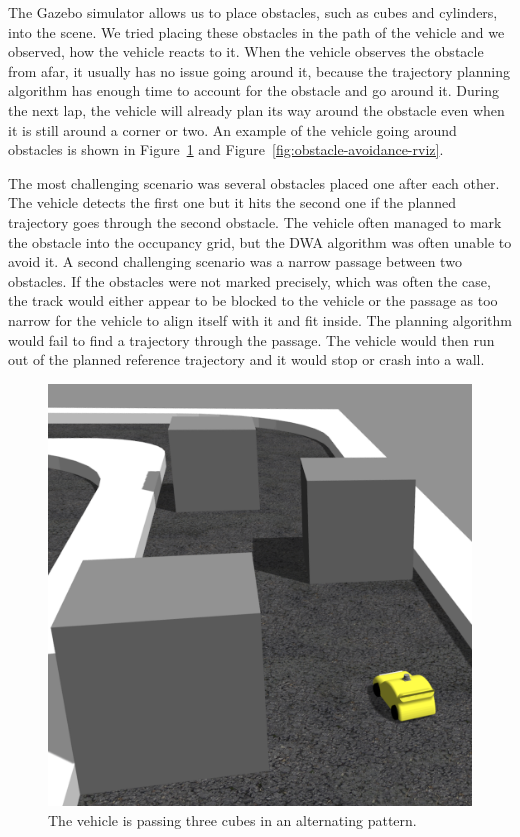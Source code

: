 The Gazebo simulator allows us to place obstacles, such as cubes and cylinders, into the scene. We tried placing these obstacles in the path of the vehicle and we observed, how the vehicle reacts to it. When the vehicle observes the obstacle from afar, it usually has no issue going around it, because the trajectory planning algorithm has enough time to account for the obstacle and go around it. During the next lap, the vehicle will already plan its way around the obstacle even when it is still around a corner or two. An example of the vehicle going around obstacles is shown in Figure~\ref{fig:obstacle-avoidance-gazebo} and Figure~\ref{fig:obstacle-avoidance-rviz}.

The most challenging scenario was several obstacles placed one after each other. The vehicle detects the first one but it hits the second one if the planned trajectory goes through the second obstacle. The vehicle often managed to mark the obstacle into the occupancy grid, but the DWA algorithm was often unable to avoid it. A second challenging scenario was a narrow passage between two obstacles. If the obstacles were not marked precisely, which was often the case, the track would either appear to be blocked to the vehicle or the passage as too narrow for the vehicle to align itself with it and fit inside. The planning algorithm would fail to find a trajectory through the passage. The vehicle would then run out of the planned reference trajectory and it would stop or crash into a wall.

\begin{figure}
	\centering
	\includegraphics[width=\textwidth]{../img/experiments/simulator/obstacles-gazebo.png}
	\caption{The vehicle is passing three cubes in an alternating pattern.}
	\label{fig:obstacle-avoidance-gazebo}
\end{figure}

